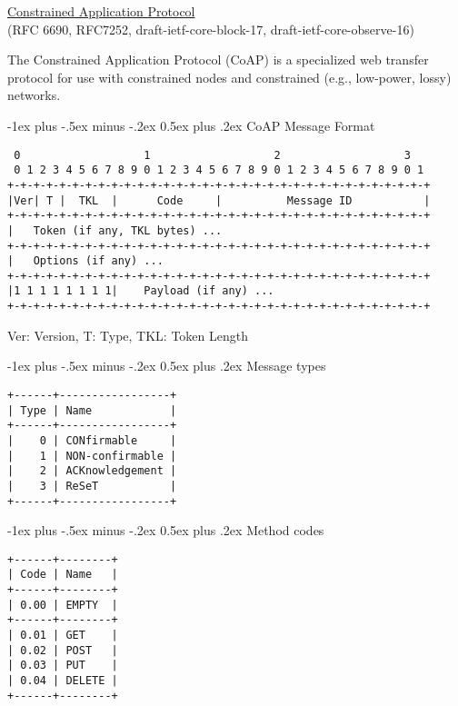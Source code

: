 \documentclass[a4,10pt,landscape]{article}
\makeatletter
\renewcommand{\section}{\@startsection{section}{1}{0mm}%
                                {-1ex plus -.5ex minus -.2ex}%
                                {0.5ex plus .2ex}%
                                {\normalfont\large\bfseries}}
\makeatother
\begin{document}
\raggedright
\footnotesize
\begin{multicols}{3}


\setlength{\premulticols}{1pt}
\setlength{\postmulticols}{1pt}
\setlength{\multicolsep}{1pt}
\setlength{\columnsep}{1pt}

\begin{center}
     \Large{\underline{Constrained Application Protocol}} \\
     {\tiny
       (RFC 6690, RFC7252, draft-ietf-core-block-17,
       draft-ietf-core-observe-16)
     }
\end{center}

The Constrained Application Protocol (CoAP) is a specialized web
transfer protocol for use with constrained nodes and constrained
(e.g., low-power, lossy) networks.

\section{CoAP Message Format}
{\tiny
\begin{verbatim}
 0                   1                   2                   3
 0 1 2 3 4 5 6 7 8 9 0 1 2 3 4 5 6 7 8 9 0 1 2 3 4 5 6 7 8 9 0 1
+-+-+-+-+-+-+-+-+-+-+-+-+-+-+-+-+-+-+-+-+-+-+-+-+-+-+-+-+-+-+-+-+
|Ver| T |  TKL  |      Code     |          Message ID           |
+-+-+-+-+-+-+-+-+-+-+-+-+-+-+-+-+-+-+-+-+-+-+-+-+-+-+-+-+-+-+-+-+
|   Token (if any, TKL bytes) ...
+-+-+-+-+-+-+-+-+-+-+-+-+-+-+-+-+-+-+-+-+-+-+-+-+-+-+-+-+-+-+-+-+
|   Options (if any) ...
+-+-+-+-+-+-+-+-+-+-+-+-+-+-+-+-+-+-+-+-+-+-+-+-+-+-+-+-+-+-+-+-+
|1 1 1 1 1 1 1 1|    Payload (if any) ...
+-+-+-+-+-+-+-+-+-+-+-+-+-+-+-+-+-+-+-+-+-+-+-+-+-+-+-+-+-+-+-+-+
\end{verbatim}
Ver: Version, T: Type, TKL: Token Length
}

\section{Message types}
{\tiny
\begin{verbatim}
+------+-----------------+
| Type | Name            |
+------+-----------------+
|    0 | CONfirmable     |
|    1 | NON-confirmable |
|    2 | ACKnowledgement |
|    3 | ReSeT           |
+------+-----------------+
\end{verbatim}
}

\section{Method codes}
{\tiny
\begin{verbatim}
+------+--------+
| Code | Name   |
+------+--------+
| 0.00 | EMPTY  |
+------+--------+
| 0.01 | GET    |
| 0.02 | POST   |
| 0.03 | PUT    |
| 0.04 | DELETE |
+------+--------+
\end{verbatim}
}


\end{multicols}
\end{document}
